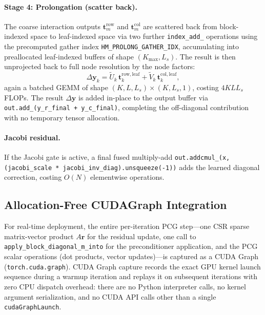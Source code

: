 \documentclass[acmtog,anonymous,review]{acmart}
\begin{document}
\paragraph{Stage 4: Prolongation (scatter back).}
The coarse interaction outputs $\mathbf{t}^\mathrm{row}_m$ and $\mathbf{t}^\mathrm{col}_m$ are
scattered back from block-indexed space to leaf-indexed space via two further \texttt{index\_add\_}
operations using the precomputed gather index \texttt{HM\_PROLONG\_GATHER\_IDX}, accumulating into
preallocated leaf-indexed buffers of shape $(K_\mathrm{max}, L_s)$.  The result is then unprojected
back to full node resolution by the node factors:
\begin{equation}
  \Delta\mathbf{y}_k = \tilde{U}_k \, \mathbf{t}^\mathrm{row,leaf}_k
                      + \tilde{V}_k \, \mathbf{t}^\mathrm{col,leaf}_k,
  \label{eq:prolong}
\end{equation}
again a batched GEMM of shape $(K, L, L_s) \times (K, L_s, 1)$, costing $4 K L L_s$ FLOPs.
The result $\Delta\mathbf{y}$ is added in-place to the output buffer via
\texttt{out.add\_(y\_r\_final + y\_c\_final)}, completing the off-diagonal contribution with no
temporary tensor allocation.

\paragraph{Jacobi residual.}
If the Jacobi gate is active, a final fused multiply-add
\texttt{out.addcmul\_(x, (jacobi\_scale * jacobi\_inv\_diag).unsqueeze(-1))} adds the learned
diagonal correction, costing $O(N)$ elementwise operations.

\subsection{Allocation-Free CUDAGraph Integration}
\label{sec:application:cudagraph}

For real-time deployment, the entire per-iteration PCG step---one CSR sparse matrix-vector product
$A\mathbf{r}$ for the residual update, one call to \texttt{apply\_block\_diagonal\_m\_into} for
the preconditioner application, and the PCG scalar operations (dot products, vector updates)---is
captured as a CUDA Graph (\texttt{torch.cuda.graph}).  CUDA Graph capture records the exact GPU
kernel launch sequence during a warmup iteration and replays it on subsequent iterations with zero
CPU dispatch overhead: there are no Python interpreter calls, no kernel argument serialization, and
no CUDA API calls other than a single \texttt{cudaGraphLaunch}.
\end{document}
